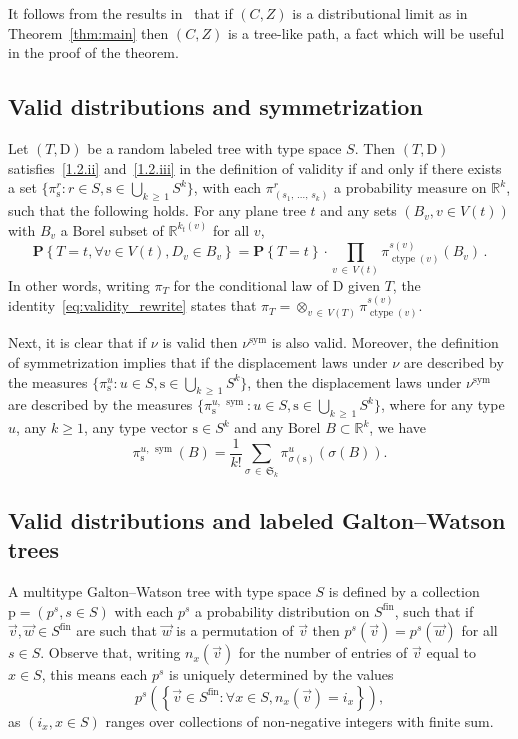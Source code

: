 \documentclass[10pt]{amsart}
\theoremstyle{definition}\newtheorem{defi}[theo]{Definition}\newtheorem{rema}[theo]{Remark}\newtheorem{exam}[theo]{Example}\newtheorem{exem}[theo]{Example}\newtheorem{nota}[theo]{Notation}
\providecommand{\R}{}
\renewcommand{\R}{\mathbb{R}}
\newcommand{\frkS}{\mathfrak{S}}
\newcommand{\rD}{\mathrm{D}}
\newcommand{\rs}{\mathrm{s}}
\newcommand{\rp}{\mathrm{p}}
\DeclareMathOperator{\sym}{sym}
\DeclareMathOperator{\cht}{ctype}
\DeclareMathOperator{\fin}{fin}
\newcommand{\p}[1]{\mathbf{P}\left\{#1\right\}}
\let\oldforall\forall
\renewcommand*{\forall}{\mathrel{\oldforall}}
\begin{document}
It follows from the results in~\cite{MarckertMokkademSnake} that if $(C,Z)$ is a distributional limit as in Theorem~\ref{thm:main} then $(C,Z)$ is a tree-like path, a fact which will be useful in the proof of the theorem.

\subsection{Valid distributions and symmetrization}\label{sub:validAndSymmetric}
Let $(T,\rD)$ be a random labeled tree with type space $S$. Then $(T,\rD)$ satisfies~\eqref{1.2.ii} and~\eqref{1.2.iii} in the definition of validity if and only if there exists a set $\{\pi^r_{\rs}: r \in S, \rs \in \bigcup_{k\,\ge\,1} S^k\}$, with each $\pi^r_{(s_1,\,\ldots,\,s_k)}$ a probability measure on $\R^k$, such that the following holds. For any plane tree $t$ and any sets $(B_v,v \in V(t))$ with $B_v$ a Borel subset of $\R^{k_t(v)}$ for all $v$,
\begin{equation}\label{eq:validity_rewrite}
\p{T=t, \forall v \in V(t), D_v \in B_v} = \p{T=t} \cdot \prod_{v\,\in\,V(t)} \pi^{s(v)}_{\cht(v)}(B_v)\,.
\end{equation}
In other words, writing $\pi_T$ for the conditional law of $\rD$ given $T$, the identity~\eqref{eq:validity_rewrite} states that $\pi_T = \otimes_{v\,\in\,V(T)} \pi_{\cht(v)}^{s(v)}$.

Next, it is clear that if $\nu$ is valid then $\nu^{\sym}$ is also valid. Moreover, the definition of symmetrization implies that if the displacement laws under $\nu$ are described by the measures $\{\pi^u_{\rs}: u \in S, \rs \in \bigcup_{k\,\ge\, 1} S^k\}$, then the displacement laws under $\nu^{\sym}$ are described by the measures $\{\pi^{u,\,\sym}_{\rs}: u \in S, \rs \in \bigcup_{k\,\ge\,1} S^k\}$, where for any type $u$, any $k \ge 1$, any type vector $\rs \in S^k$ and any Borel $B \subset \R^k$, we have
\begin{equation}\label{def:piSym}
\pi^{u,\,\sym}_{\rs} (B) = \frac{1}{k!}\sum_{\sigma\,\in \,\frkS_k} \pi^{u}_{\sigma(\rs)}(\sigma(B)).
\end{equation}


\subsection{Valid distributions and labeled Galton--Watson trees}\label{sub:validAndGW}
A multitype Galton--Watson tree with type space $S$ is defined by a collection $\rp=(p^s,s \in S)$ with each $p^s$ a probability distribution on $S^{\fin}$, such that if $\vec{v},\vec{w} \in S^{\fin}$ are such that $\vec{w}$ is a permutation of $\vec{v}$ then $p^s(\vec{v})=p^s(\vec{w})$ for all $s \in S$. Observe that, writing $n_x(\vec{v})$ for the number of entries of $\vec{v}$ equal to $x \in S$, this means each $p^s$ is uniquely determined by the values
\[
p^s\left(\left\{\vec{v} \in S^{\fin}: \forall x \in S, n_x(\vec{v})=i_x\right\}\right),
\]
as $(i_x,x \in S)$ ranges over collections of non-negative integers with finite sum.
\end{document}

